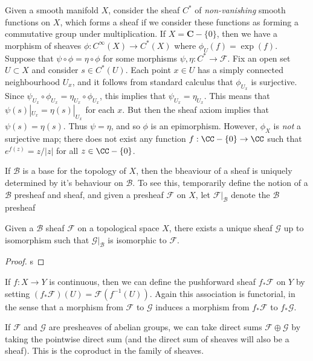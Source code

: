 \begin{example}
    Given a smooth manifold $X$, consider the sheaf $C^*$ of \emph{non-vanishing} smooth functions on $X$, which forms a sheaf if we consider these functions as forming a commutative group under multiplication. If $X = \mathbf{C} - \{ 0 \}$, then we have a morphism of sheaves $\phi: C^\infty(X) \to C^*(X)$ where $\phi_U(f) = \exp(f)$. Suppose that $\psi \circ \phi = \eta \circ \phi$ for some morphisms $\psi,\eta: C^* \to \mathcal{F}$. Fix an open set $U \subset X$ and consider $s \in C^*(U)$. Each point $x \in U$ has a simply connected neighbourhood $U_x$, and it follows from standard calculus that $\phi_{U_x}$ is surjective. Since $\psi_{U_x} \circ \phi_{U_x} = \eta_{U_x} \circ \phi_{U_x}$, this implies that $\psi_{U_x} = \eta_{U_x}$. This means that $\psi(s)|_{U_x} = \eta(s)|_{U_x}$ for each $x$. But then the sheaf axiom implies that $\psi(s) = \eta(s)$. Thus $\psi = \eta$, and so $\phi$ is an epimorphism. However, $\phi_X$ is \emph{not} a surjective map; there does not exist any function $f: \CC - \{ 0 \} \to \CC$ such that $e^{f(z)} = z/|z|$ for all $z \in \CC - \{ 0 \}$.
\end{example}

If $\mathcal{B}$ is a base for the topology of $X$, then the bheaviour of a sheaf is uniquely determined by it's behaviour on $\mathcal{B}$. To see this, temporarily define the notion of a $\mathcal{B}$ presheaf and sheaf, and given a presheaf $\mathcal{F}$ on $X$, let $\mathcal{F}|_{\mathcal{B}}$ denote the $\mathcal{B}$ presheaf 

\begin{lemma}
    Given a $\mathcal{B}$ sheaf $\mathcal{F}$ on a topological space $X$, there exists a unique sheaf $\mathcal{G}$ up to isomorphism such that $\mathcal{G}|_{\mathcal{B}}$ is isomorphic to $\mathcal{F}$.
\end{lemma}
\begin{proof}
    s
\end{proof}

\begin{example}
    If $f: X \to Y$ is continuous, then we can define the pushforward sheaf $f_* \mathcal{F}$ on $Y$ by setting $(f_* \mathcal{F})(U) = \mathcal{F}(f^{-1}(U))$. Again this association is functorial, in the sense that a morphism from $\mathcal{F}$ to $\mathcal{G}$ induces a morphism from $f_* \mathcal{F}$ to $f_* \mathcal{G}$.
\end{example}

\begin{example}
    If $\mathcal{F}$ and $\mathcal{G}$ are presheaves of abelian groups, we can take direct sums $\mathcal{F} \oplus \mathcal{G}$ by taking the pointwise direct sum (and the direct sum of sheaves will also be a sheaf). This is the coproduct in the family of sheaves.
\end{example}

